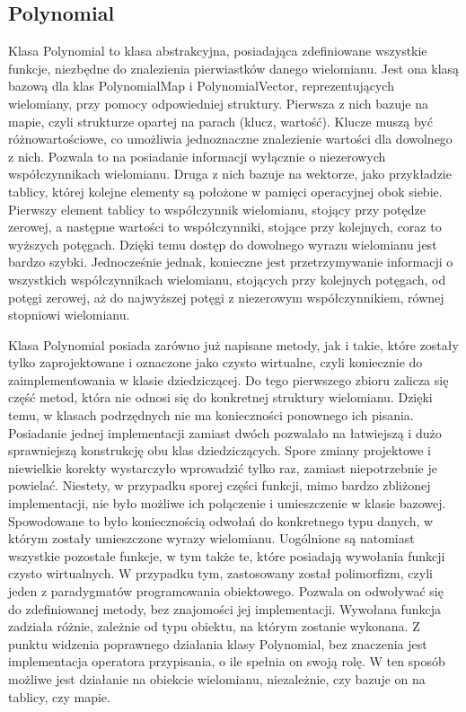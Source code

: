 \documentclass[twoside,a4paper]{book}
\begin{document}
\subsection{Polynomial}

Klasa Polynomial to klasa abstrakcyjna, posiadająca zdefiniowane wszystkie funkcje, niezbędne do znalezienia pierwiastków danego wielomianu. Jest ona klasą bazową dla klas PolynomialMap i PolynomialVector, reprezentujących wielomiany, przy pomocy odpowiedniej struktury. Pierwsza z nich bazuje na mapie, czyli strukturze opartej na parach (klucz, wartość). Klucze muszą być różnowartościowe, co umożliwia jednoznaczne znalezienie wartości dla dowolnego z nich. Pozwala to na posiadanie informacji wyłącznie o niezerowych współczynnikach wielomianu. Druga z nich bazuje na wektorze, jako przykładzie tablicy, której kolejne elementy są położone w pamięci operacyjnej obok siebie. Pierwszy element tablicy to współczynnik wielomianu, stojący przy potędze zerowej, a następne wartości to współczynniki, stojące przy kolejnych, coraz to wyższych potęgach. Dzięki temu dostęp do dowolnego wyrazu wielomianu jest bardzo szybki. Jednocześnie jednak, konieczne jest przetrzymywanie informacji o wszystkich współczynnikach wielomianu, stojących przy kolejnych potęgach, od potęgi zerowej, aż do najwyższej potęgi z niezerowym współczynnikiem, równej stopniowi wielomianu.

Klasa Polynomial posiada zarówno już napisane metody, jak i takie, które zostały tylko zaprojektowane i oznaczone jako czysto wirtualne, czyli koniecznie do zaimplementowania w klasie dziedziczącej. Do tego pierwszego zbioru zalicza się część metod, która nie odnosi się do konkretnej struktury wielomianu. Dzięki temu, w klasach podrzędnych nie ma konieczności ponownego ich pisania. Posiadanie jednej implementacji zamiast dwóch pozwalało na łatwiejszą i dużo sprawniejszą konstrukcję obu klas dziedziczących. Spore zmiany projektowe i niewielkie korekty wystarczyło wprowadzić tylko raz, zamiast niepotrzebnie je powielać. Niestety, w przypadku sporej części funkcji, mimo bardzo zbliżonej implementacji, nie było możliwe ich połączenie i umieszczenie w klasie bazowej. Spowodowane to było koniecznością odwołań do konkretnego typu danych, w którym zostały umieszczone wyrazy wielomianu. Uogólnione są natomiast wszystkie pozostałe funkcje, w tym także te, które posiadają wywołania funkcji czysto wirtualnych. W przypadku tym, zastosowany został polimorfizm, czyli jeden z paradygmatów programowania obiektowego. Pozwala on odwoływać się do zdefiniowanej metody, bez znajomości jej implementacji. Wywołana funkcja zadziała różnie, zależnie od typu obiektu, na którym zostanie wykonana. Z punktu widzenia poprawnego działania klasy Polynomial, bez znaczenia jest implementacja operatora przypisania, o ile spełnia on swoją rolę. W ten sposób możliwe jest działanie na obiekcie wielomianu, niezależnie, czy bazuje on na tablicy, czy mapie.
\end{document}
